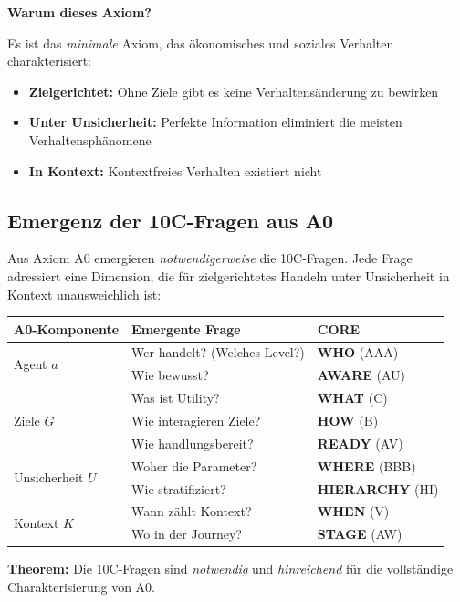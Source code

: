 \textbf{Warum dieses Axiom?}

Es ist das \textit{minimale} Axiom, das \"{o}konomisches und soziales Verhalten charakterisiert:
\begin{itemize}[nosep]
\item \textbf{Zielgerichtet:} Ohne Ziele gibt es keine Verhaltens\"{a}nderung zu bewirken
\item \textbf{Unter Unsicherheit:} Perfekte Information eliminiert die meisten Verhaltensph\"{a}nomene
\item \textbf{In Kontext:} Kontextfreies Verhalten existiert nicht
\end{itemize}

\subsection{Emergenz der 10C-Fragen aus A0}
\label{sec:17-9c-emergence}

Aus Axiom A0 emergieren \textit{notwendigerweise} die 10C-Fragen. Jede Frage adressiert eine Dimension, die f\"{u}r zielgerichtetes Handeln unter Unsicherheit in Kontext unausweichlich ist:

\begin{tcolorbox}[colback=blue!5!white, colframe=blue!75!black,
    title=\textbf{Die Emergenz der 10C aus A0}]

\begin{center}
\renewcommand{\arraystretch}{1.4}
\begin{tabular}{@{}lll@{}}
\toprule
\textbf{A0-Komponente} & \textbf{Emergente Frage} & \textbf{CORE} \\
\midrule
\multirow{2}{*}{Agent $a$} & Wer handelt? (Welches Level?) & \textbf{WHO} (AAA) \\
 & Wie bewusst? & \textbf{AWARE} (AU) \\
\midrule
\multirow{3}{*}{Ziele $G$} & Was ist Utility? & \textbf{WHAT} (C) \\
 & Wie interagieren Ziele? & \textbf{HOW} (B) \\
 & Wie handlungsbereit? & \textbf{READY} (AV) \\
\midrule
\multirow{2}{*}{Unsicherheit $U$} & Woher die Parameter? & \textbf{WHERE} (BBB) \\
 & Wie stratifiziert? & \textbf{HIERARCHY} (HI) \\
\midrule
\multirow{2}{*}{Kontext $K$} & Wann z\"{a}hlt Kontext? & \textbf{WHEN} (V) \\
 & Wo in der Journey? & \textbf{STAGE} (AW) \\
\bottomrule
\end{tabular}
\end{center}

\textbf{Theorem:} Die 10C-Fragen sind \textit{notwendig} und \textit{hinreichend} f\"{u}r die vollst\"{a}ndige Charakterisierung von A0.

\end{tcolorbox}

